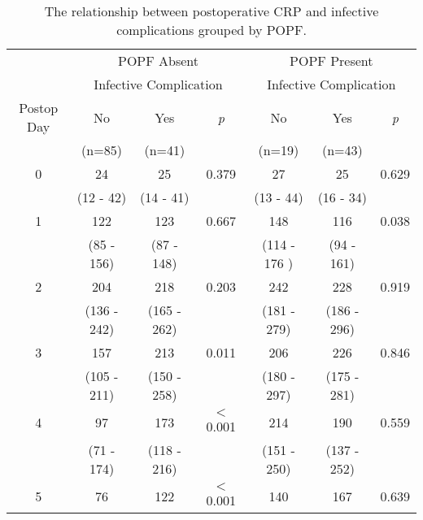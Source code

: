 \begin{table}[h]
	\centering
	\caption{The relationship between postoperative CRP and infective complications grouped by POPF.}
	\label{table:crp_comp_vs_infections_popf_y1n0}
	\begin{tabular}{| c | c c c | c c c |}
		\hline
		           &      \multicolumn{3}{c|}{POPF Absent}       &      \multicolumn{3}{c|}{POPF Present}      \\
		           & \multicolumn{3}{c|}{Infective Complication} & \multicolumn{3}{c|}{Infective Complication} \\
		Postop Day & No          & Yes         & \textit{p}      & No           & Yes         & \textit{p}     \\
		           & (n=85)      & (n=41)      &                 & (n=19)       & (n=43)      &  \\ \hline
		0          & 24          & 25          & 0.379           & 27           & 25          & 0.629          \\
		           & (12 - 42)   & (14 - 41)   &                 & (13 - 44)    & (16 - 34)   &  \\
		1          & 122         & 123         & 0.667           & 148          & 116         & 0.038          \\
		           & (85 - 156)  & (87 - 148)  &                 & (114 - 176 ) & (94 - 161)  &  \\
		2          & 204         & 218         & 0.203           & 242          & 228         & 0.919          \\
		           & (136 - 242) & (165 - 262) &                 & (181 - 279)  & (186 - 296) &  \\
		3          & 157         & 213         & 0.011           & 206          & 226         & 0.846          \\
		           & (105 - 211) & (150 - 258) &                 & (180 - 297)  & (175 - 281) &  \\
		4          & 97          & 173         & $<$0.001        & 214          & 190         & 0.559          \\
		           & (71 - 174)  & (118 - 216) &                 & (151 - 250)  & (137 - 252) &  \\
		5          & 76          & 122         & $<$0.001        & 140          & 167         & 0.639          \\

\end{tabular}
\end{table}
